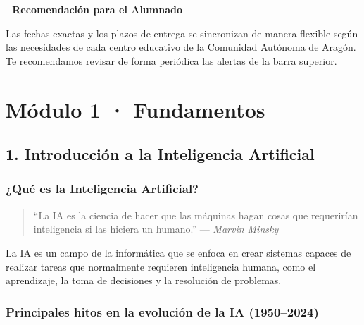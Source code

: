 \documentclass[
  spanish,
  letterpaper,
  DIV=11,
  numbers=noendperiod,
  oneside]{scrreprt}
\begin{document}
\begin{tcolorbox}[enhanced jigsaw, arc=.35mm, bottomrule=.15mm, breakable, colback=white, colframe=quarto-callout-tip-color-frame, left=2mm, leftrule=.75mm, opacityback=0, rightrule=.15mm, toprule=.15mm]

\vspace{-3mm}\textbf{📢 Recomendación para el Alumnado}\vspace{3mm}

Las fechas exactas y los plazos de entrega se sincronizan de manera
flexible según las necesidades de cada centro educativo de la Comunidad
Autónoma de Aragón. Te recomendamos revisar de forma periódica las
alertas de la barra superior.

\end{tcolorbox}

\part{Módulo 1 · Fundamentos}

\chapter{1. Introducción a la Inteligencia
Artificial}\label{introducciuxf3n-a-la-inteligencia-artificial}

\section{¿Qué es la Inteligencia
Artificial?}\label{quuxe9-es-la-inteligencia-artificial}

\begin{quote}
``La IA es la ciencia de hacer que las máquinas hagan cosas que
requerirían inteligencia si las hiciera un humano.'' --- \emph{Marvin
Minsky}
\end{quote}

La IA es un campo de la informática que se enfoca en crear sistemas
capaces de realizar tareas que normalmente requieren inteligencia
humana, como el aprendizaje, la toma de decisiones y la resolución de
problemas.

\section{Principales hitos en la evolución de la IA
(1950--2024)}\label{principales-hitos-en-la-evoluciuxf3n-de-la-ia-19502024}

\protect{}\label{timeline}
\end{document}
